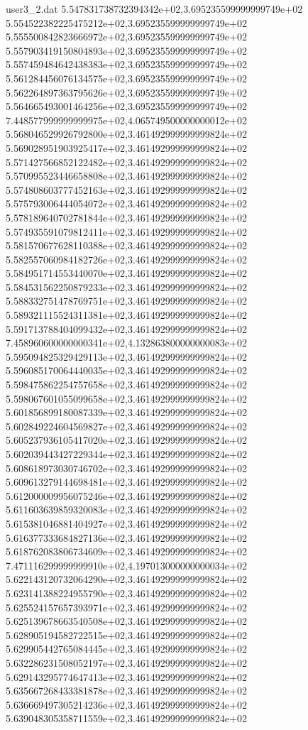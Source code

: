 \begin{filecontents}{user3_2.dat}
5.547831738732394342e+02,3.695235599999999749e+02
5.554522382225475212e+02,3.695235599999999749e+02
5.555500842823666972e+02,3.695235599999999749e+02
5.557903419150804893e+02,3.695235599999999749e+02
5.557459484642438383e+02,3.695235599999999749e+02
5.561284456076134575e+02,3.695235599999999749e+02
5.562264897363795626e+02,3.695235599999999749e+02
5.564665493001464256e+02,3.695235599999999749e+02
7.448577999999999975e+02,4.065749500000000012e+02
5.568046529926792800e+02,3.461492999999999824e+02
5.569028951903925417e+02,3.461492999999999824e+02
5.571427566852122482e+02,3.461492999999999824e+02
5.570995523446658808e+02,3.461492999999999824e+02
5.574808603777452163e+02,3.461492999999999824e+02
5.575793006444054072e+02,3.461492999999999824e+02
5.578189640702781844e+02,3.461492999999999824e+02
5.574935591079812411e+02,3.461492999999999824e+02
5.581570677628110388e+02,3.461492999999999824e+02
5.582557060984182726e+02,3.461492999999999824e+02
5.584951714553440070e+02,3.461492999999999824e+02
5.584531562250879233e+02,3.461492999999999824e+02
5.588332751478769751e+02,3.461492999999999824e+02
5.589321115524311381e+02,3.461492999999999824e+02
5.591713788404099432e+02,3.461492999999999824e+02
7.458960600000000341e+02,4.132863800000000083e+02
5.595094825329429113e+02,3.461492999999999824e+02
5.596085170064440035e+02,3.461492999999999824e+02
5.598475862254757658e+02,3.461492999999999824e+02
5.598067601055099658e+02,3.461492999999999824e+02
5.601856899180087339e+02,3.461492999999999824e+02
5.602849224604569827e+02,3.461492999999999824e+02
5.605237936105417020e+02,3.461492999999999824e+02
5.602039443427229344e+02,3.461492999999999824e+02
5.608618973030746702e+02,3.461492999999999824e+02
5.609613279144698481e+02,3.461492999999999824e+02
5.612000009956075246e+02,3.461492999999999824e+02
5.611603639859320083e+02,3.461492999999999824e+02
5.615381046881404927e+02,3.461492999999999824e+02
5.616377333684827136e+02,3.461492999999999824e+02
5.618762083806734609e+02,3.461492999999999824e+02
7.471116299999999910e+02,4.197013000000000034e+02
5.622143120732064290e+02,3.461492999999999824e+02
5.623141388224955790e+02,3.461492999999999824e+02
5.625524157657393971e+02,3.461492999999999824e+02
5.625139678663540508e+02,3.461492999999999824e+02
5.628905194582722515e+02,3.461492999999999824e+02
5.629905442765084445e+02,3.461492999999999824e+02
5.632286231508052197e+02,3.461492999999999824e+02
5.629143295774647413e+02,3.461492999999999824e+02
5.635667268433381878e+02,3.461492999999999824e+02
5.636669497305214236e+02,3.461492999999999824e+02
5.639048305358711559e+02,3.461492999999999824e+02

\end{filecontents}
